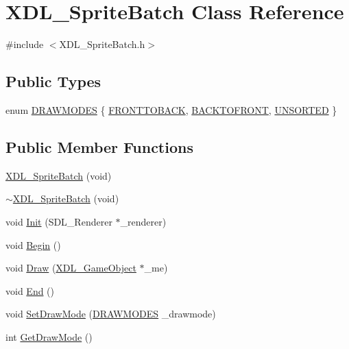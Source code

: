 \hypertarget{class_x_d_l___sprite_batch}{\section{X\-D\-L\-\_\-\-Sprite\-Batch Class Reference}
\label{class_x_d_l___sprite_batch}
}


{\ttfamily \#include $<$X\-D\-L\-\_\-\-Sprite\-Batch.\-h$>$}

\subsection*{Public Types}
\begin{DoxyCompactItemize}
\item 
enum \hyperlink{class_x_d_l___sprite_batch_a0dba0557842cdf21917adc2ef44125e6}{D\-R\-A\-W\-M\-O\-D\-E\-S} \{ \hyperlink{class_x_d_l___sprite_batch_a0dba0557842cdf21917adc2ef44125e6aeeb8ab8bdfb94d3413c3ded50d232d9b}{F\-R\-O\-N\-T\-T\-O\-B\-A\-C\-K}, 
\hyperlink{class_x_d_l___sprite_batch_a0dba0557842cdf21917adc2ef44125e6af0aff02dad6d665eb8a61c108e5ca1d1}{B\-A\-C\-K\-T\-O\-F\-R\-O\-N\-T}, 
\hyperlink{class_x_d_l___sprite_batch_a0dba0557842cdf21917adc2ef44125e6a4dea32cd64020138077648d29c34f58a}{U\-N\-S\-O\-R\-T\-E\-D}
 \}
\end{DoxyCompactItemize}
\subsection*{Public Member Functions}
\begin{DoxyCompactItemize}
\item 
\hyperlink{class_x_d_l___sprite_batch_a509e7c91d956bd35ce5a9b12d037a807}{X\-D\-L\-\_\-\-Sprite\-Batch} (void)
\item 
\hyperlink{class_x_d_l___sprite_batch_a33219d922bae40ae5952f39b8e1b3065}{$\sim$\-X\-D\-L\-\_\-\-Sprite\-Batch} (void)
\item 
void \hyperlink{class_x_d_l___sprite_batch_a39d0ad77cd98c6eed1d7188c0867f954}{Init} (S\-D\-L\-\_\-\-Renderer $\ast$\-\_\-renderer)
\item 
void \hyperlink{class_x_d_l___sprite_batch_af6db9acdec8c4b1f31275b24d99d50d4}{Begin} ()
\item 
void \hyperlink{class_x_d_l___sprite_batch_a63a34e3458a687841c8a9c3d1de876b6}{Draw} (\hyperlink{class_x_d_l___game_object}{X\-D\-L\-\_\-\-Game\-Object} $\ast$\-\_\-me)
\item 
void \hyperlink{class_x_d_l___sprite_batch_a60d1f227cf1ef2270f58711b6d37a20f}{End} ()
\item 
void \hyperlink{class_x_d_l___sprite_batch_a696b70cf462c9bad88f255f3f8a79506}{Set\-Draw\-Mode} (\hyperlink{class_x_d_l___sprite_batch_a0dba0557842cdf21917adc2ef44125e6}{D\-R\-A\-W\-M\-O\-D\-E\-S} \-\_\-drawmode)
\item 
int \hyperlink{class_x_d_l___sprite_batch_a48fa9280c8a1dc5c93a3732adacca526}{Get\-Draw\-Mode} ()
\end{DoxyCompactItemize}
